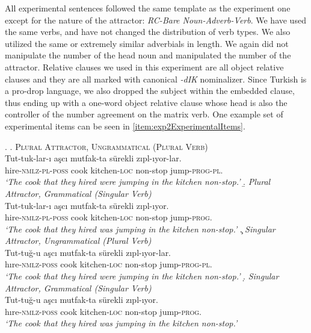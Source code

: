 \documentclass[doc,a4paper,man,natbib,floatsintext,noextraspace]{apa6}\usepackage[]{graphicx}\usepackage[]{color}
\begin{document}
All experimental sentences followed the same template as the experiment one except for the nature of the attractor: \textit{RC-Bare Noun-Adverb-Verb}. 
We have used the same verbs, and have not changed the distribution of verb types. We also utilized the same or extremely similar adverbials in length. We again did not manipulate the number of the head noun and manipulated the number of the attractor. Relative clauses we used in this experiment are all object relative clauses and they are all marked with canonical \textit{-dIK} nominalizer. Since Turkish is a pro-drop language, we also dropped the subject within the embedded clause, thus ending up with a one-word object relative clause whose head is also the controller of the number agreement on the matrix verb. One example set of experimental items can be seen in \ref{item:exp2ExperimentalItems}.


\ex. \label{item:exp2ExperimentalItems}
%
\a. \textsc{Plural Attractor, Ungrammatical (Plural Verb)}\label{item:exp2expitem-plpl}\\ 
  \gll *Tut-tuk-lar-ı aşcı mutfak-ta sürekli zıpl-ıyor-lar.\\ 
  hire-\textsc{nmlz}-\textsc{pl}-\textsc{poss}  cook kitchen-\textsc{loc} non-stop  jump-\textsc{prog}-\textsc{pl}.\\
  \glt \textit{`The cook that they hired were jumping in the kitchen non-stop.'}
%
\b. \textit{Plural Attractor, Grammatical (Singular Verb)}\label{item:exp2expitem-plsg}\\ 
  \gll Tut-tuk-lar-ı aşcı mutfak-ta sürekli zıpl-ıyor.\\ 
  hire-\textsc{nmlz}-\textsc{pl}-\textsc{poss}  cook kitchen-\textsc{loc} non-stop  jump-\textsc{prog}.\\
  \glt \textit{`The cook that they hired was jumping in the kitchen non-stop.'}
%
\c. \textit{Singular Attractor, Ungrammatical (Plural Verb)}\label{item:exp2expitem-sgpl}\\
  \gll *Tut-tuğ-u aşcı mutfak-ta sürekli zıpl-ıyor-lar.\\ 
  hıre-\textsc{nmlz}-\textsc{poss}  cook kitchen-\textsc{loc} non-stop  jump-\textsc{prog}-\textsc{pl}.\\
  \glt \textit{`The cook that they hired were jumping in the kitchen non-stop.'}
%
\d. \textit{Singular Attractor, Grammatical (Singular Verb)}\label{item:exp2expitem-sgsg}\\ 
  \gll Tut-tuğ-u aşcı mutfak-ta sürekli zıpl-ıyor.\\ 
  hıre-\textsc{nmlz}-\textsc{poss}  cook kitchen-\textsc{loc} non-stop  jump-\textsc{prog}.\\
  \glt \textit{`The cook that they hired was jumping in the kitchen non-stop.'}
\end{document}
